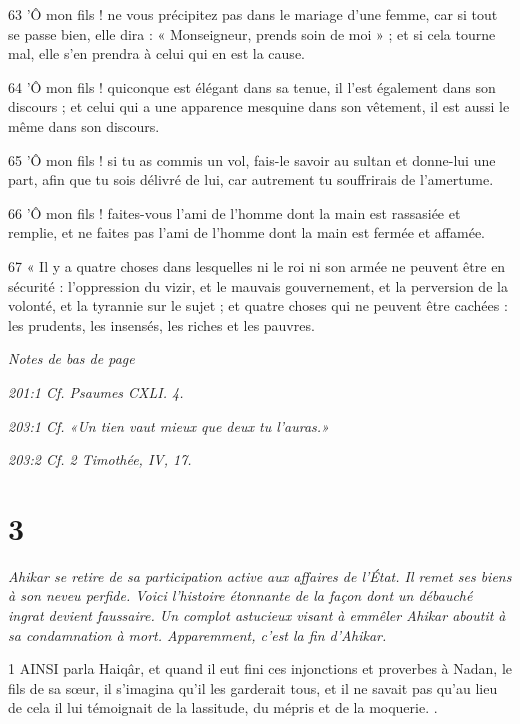 \par 63 'Ô mon fils ! ne vous précipitez pas dans le mariage d'une femme, car si tout se passe bien, elle dira : « Monseigneur, prends soin de moi » ; et si cela tourne mal, elle s'en prendra à celui qui en est la cause.

\par 64 'Ô mon fils ! quiconque est élégant dans sa tenue, il l'est également dans son discours ; et celui qui a une apparence mesquine dans son vêtement, il est aussi le même dans son discours.

\par 65 'Ô mon fils ! si tu as commis un vol, fais-le savoir au sultan et donne-lui une part, afin que tu sois délivré de lui, car autrement tu souffrirais de l'amertume.

\par 66 'Ô mon fils ! faites-vous l'ami de l'homme dont la main est rassasiée et remplie, et ne faites pas l'ami de l'homme dont la main est fermée et affamée.

\par 67 « Il y a quatre choses dans lesquelles ni le roi ni son armée ne peuvent être en sécurité : l'oppression du vizir, et le mauvais gouvernement, et la perversion de la volonté, et la tyrannie sur le sujet ; et quatre choses qui ne peuvent être cachées : les prudents, les insensés, les riches et les pauvres.

\par \textit{Notes de bas de page}

\par \textit{201:1 Cf. Psaumes CXLI. 4.}

\par \textit{203:1 Cf. «Un tien vaut mieux que deux tu l'auras.»}

\par \textit{203:2 Cf. 2 Timothée, IV, 17.}

\chapter{3}

\par \textit{Ahikar se retire de sa participation active aux affaires de l'État. Il remet ses biens à son neveu perfide. Voici l’histoire étonnante de la façon dont un débauché ingrat devient faussaire. Un complot astucieux visant à emmêler Ahikar aboutit à sa condamnation à mort. Apparemment, c'est la fin d'Ahikar.}

\par 1 AINSI parla Haiqâr, et quand il eut fini ces injonctions et proverbes à Nadan, le fils de sa sœur, il s'imagina qu'il les garderait tous, et il ne savait pas qu'au lieu de cela il lui témoignait de la lassitude, du mépris et de la moquerie. .

